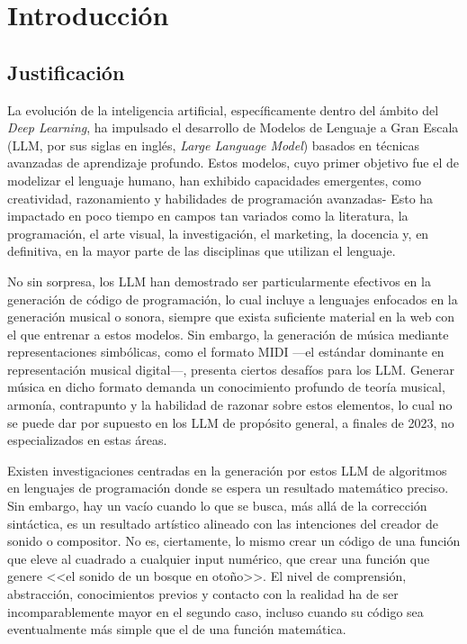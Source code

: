 \chapter{Introducción}

\section{Justificación}

La evolución de la inteligencia artificial, específicamente dentro del ámbito del \textit{Deep Learning}, ha impulsado el desarrollo de Modelos de Lenguaje a Gran Escala (LLM, por sus siglas en inglés, \textit{Large Language Model}) basados en técnicas avanzadas de aprendizaje profundo. Estos modelos, cuyo primer objetivo fue el de modelizar el lenguaje humano, han exhibido capacidades emergentes, como creatividad, razonamiento y habilidades de programación avanzadas- Esto ha impactado en poco tiempo en campos tan variados como la literatura, la programación, el arte visual, la investigación, el marketing, la docencia y, en definitiva, en la mayor parte de las disciplinas que utilizan el lenguaje.

No sin sorpresa, los LLM han demostrado ser particularmente efectivos en la generación de código de programación, lo cual incluye a lenguajes enfocados en la generación musical o sonora, siempre que exista suficiente material en la web con el que entrenar a estos modelos. Sin embargo, la generación de música mediante representaciones simbólicas, como el formato MIDI —el estándar dominante en representación musical digital—, presenta ciertos desafíos para los LLM. Generar música en dicho formato demanda un conocimiento profundo de teoría musical, armonía, contrapunto y la habilidad de razonar sobre estos elementos, lo cual no se puede dar por supuesto en los LLM de propósito general, a finales de 2023, no especializados en estas áreas.

Existen investigaciones centradas en la generación por estos LLM de algoritmos en lenguajes de programación donde se espera un resultado matemático preciso. Sin embargo, hay un vacío cuando lo que se busca, más allá de la corrección sintáctica, es un resultado artístico alineado con las intenciones del creador de sonido o compositor. No es, ciertamente, lo mismo crear un código de una función que eleve al cuadrado a cualquier input numérico, que crear una función que genere <<el sonido de un bosque en otoño>>. El nivel de comprensión, abstracción, conocimientos previos y contacto con la realidad ha de ser incomparablemente mayor en el segundo caso, incluso cuando su código sea eventualmente más simple que el de una función matemática.

